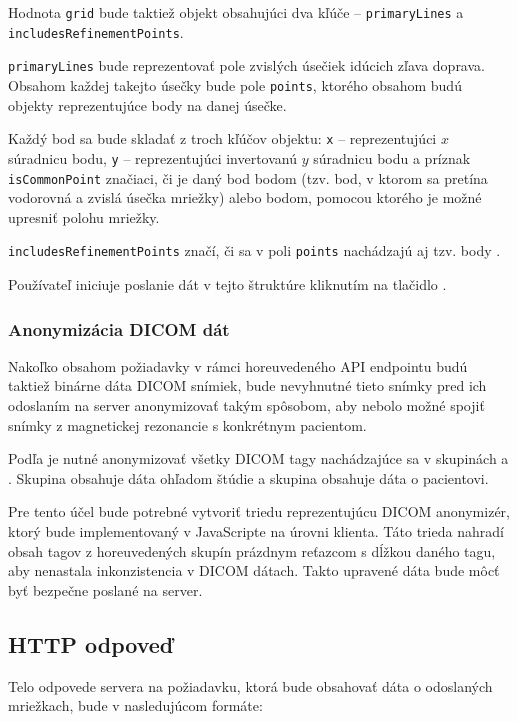 Hodnota \texttt{grid} bude taktiež objekt obsahujúci dva kľúče -- \texttt{primaryLines} a  \texttt{includesRefinementPoints}.

\texttt{primaryLines} bude reprezentovať pole zvislých úsečiek idúcich zľava doprava.
Obsahom každej takejto úsečky bude pole \texttt{points}, ktorého obsahom budú objekty reprezentujúce body na danej úsečke.

Každý bod sa bude skladať z troch kľúčov objektu: \texttt{x} -- reprezentujúci $x$ súradnicu bodu, \texttt{y} -- reprezentujúci invertovanú $y$ súradnicu bodu a príznak \texttt{isCommonPoint} značiaci, či je daný bod  bodom (tzv. bod, v ktorom sa pretína vodorovná a zvislá úsečka mriežky) alebo  bodom, pomocou ktorého je možné upresniť polohu mriežky. 

\texttt{includesRefinementPoints} značí, či sa v poli \texttt{points} nachádzajú aj tzv.  body .

Používateľ iniciuje poslanie dát v tejto štruktúre kliknutím na tlačidlo .

\subsubsection {Anonymizácia DICOM dát}
Nakoľko obsahom požiadavky v rámci horeuvedeného API endpointu budú taktiež binárne dáta DICOM snímiek, bude nevyhnutné tieto snímky pred ich odoslaním na server anonymizovať takým spôsobom, aby nebolo možné spojiť snímky z magnetickej rezonancie s konkrétnym pacientom.

Podľa \cite{Varma_2012} je nutné anonymizovať všetky DICOM tagy nachádzajúce sa v skupinách  a . Skupina  obsahuje dáta ohľadom štúdie a skupina  obsahuje dáta o pacientovi.

Pre tento účel bude potrebné vytvoriť triedu reprezentujúcu DICOM anonymizér, ktorý bude implementovaný v JavaScripte na úrovni klienta. Táto trieda nahradí obsah tagov z horeuvedených skupín prázdnym reťazcom s dĺžkou daného tagu, aby nenastala inkonzistencia v DICOM dátach. Takto upravené dáta bude môcť byť bezpečne poslané na server.

\clearpage

\subsection{HTTP odpoveď}
Telo odpovede servera na požiadavku, ktorá bude obsahovať dáta o odoslaných mriežkach, bude v nasledujúcom formáte:

